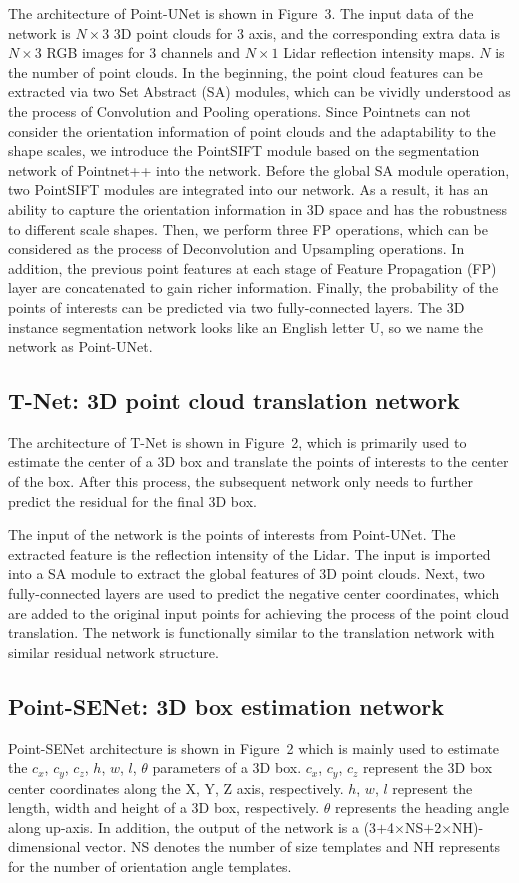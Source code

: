 \documentclass[letterpaper]{article}
\begin{document}
The architecture of Point-UNet is shown in Figure~3. The input data of the network is $N\times3$ 3D point clouds for 3 axis, and the corresponding extra data is $N\times3$ RGB images for 3 channels and $N\times1$ Lidar reflection intensity maps. $N$ is the number of point clouds. In the beginning, the point cloud features can be extracted via two Set Abstract (SA) modules, which can be vividly understood as the process of Convolution and Pooling operations. Since Pointnets can not consider the orientation information of point clouds and the adaptability to the shape scales, we introduce the PointSIFT module based on the segmentation network of Pointnet++ into the network. Before the global SA module operation, two PointSIFT modules are integrated into our network. As a result, it has an ability to capture the orientation information in 3D space and has the robustness to different scale shapes. Then, we perform three FP operations, which can be considered as the process of Deconvolution and Upsampling operations. In addition, the previous point features at each stage of Feature Propagation (FP) layer are concatenated to gain richer information. Finally, the probability of the points of interests can be predicted via two fully-connected layers. The 3D instance segmentation network looks like an English letter U, so we name the network as Point-UNet.

\subsection{T-Net: 3D point cloud translation network}
The architecture of T-Net is shown in Figure~2, which is primarily used to estimate the center of a 3D box and translate the points of interests to the center of the box. After this process, the subsequent network only needs to further predict the residual for the final 3D box.

The input of the network is the points of interests from Point-UNet. The extracted feature is the reflection intensity of the Lidar. The input is imported into a SA module to extract the global features of 3D point clouds. Next, two fully-connected layers are used to predict the negative center coordinates, which are added to the original input points for achieving the process of the point cloud translation. The network is functionally similar to the translation network with similar residual network structure.

\subsection{Point-SENet: 3D box estimation network}
Point-SENet architecture is shown in Figure~2 which is mainly used to estimate the {$c_x$, $c_y$, $c_z$, $h$, $w$, $l$, $\theta$} parameters of a 3D box. $c_x$, $c_y$, $c_z$ represent the 3D box center coordinates along the X, Y, Z axis, respectively. $h$, $w$, $l$ represent the length, width and height of a 3D box, respectively. $\theta$ represents the heading angle along up-axis. In addition, the output of the network is a (3$+$4$\times$NS$+$2$\times$NH)-dimensional vector. NS denotes the number of size templates and NH represents for the number of orientation angle templates.
\end{document}
